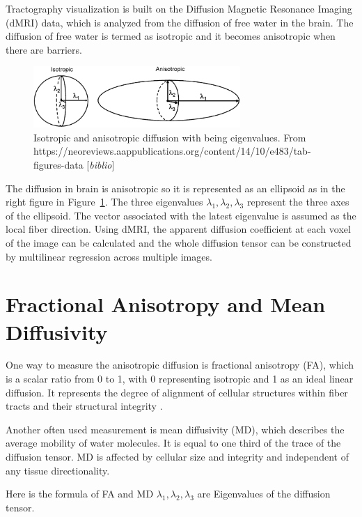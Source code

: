 \documentclass[hyperref, plainreport, noproblem]{cgvpub1}
\newcommand{\comment}[1]{{\color{red}[\textit{#1}]}}
\begin{document}
Tractography visualization is built on the Diffusion Magnetic Resonance Imaging (dMRI) data, which is analyzed from the diffusion of free water in the brain. The diffusion of free water is termed as isotropic and it becomes anisotropic when there are barriers. 

\begin{figure}[h]
	\centering
	\includegraphics[width=0.7\textwidth]{iso_ani_diff}
	\caption{Isotropic and anisotropic diffusion with  being eigenvalues. From
https://neoreviews.aappublications.org/content/14/10/e483/tab-figures-data \comment{biblio}}
	\label{fig:iso_ani_diff}
\end{figure}

The diffusion in brain is anisotropic so it is represented as an ellipsoid as in the right figure in Figure~\ref{fig:iso_ani_diff}. The three eigenvalues  $\lambda_1, \lambda_2, \lambda_3$ represent the three axes of the ellipsoid. The vector associated with the latest eigenvalue is assumed as the local fiber direction.\cite{tak}
Using dMRI, the apparent diffusion coefficient at each voxel of the image can be calculated and the whole diffusion tensor can be constructed by multilinear regression across multiple images.

\section{Fractional Anisotropy and Mean Diffusivity }
One way to measure the anisotropic diffusion is fractional anisotropy (FA), which is a scalar ratio from 0 to 1, with 0 representing isotropic and 1 as an ideal linear diffusion. It represents the degree of alignment of cellular structures within fiber tracts and their structural integrity \cite{cer}.

Another often used measurement is mean diffusivity (MD), which describes the average mobility of water molecules. It is equal to one third of the trace of the diffusion tensor. MD is affected by cellular size and integrity and independent of any tissue directionality. \cite{cer}

Here is the formula of FA and MD $\lambda_1, \lambda_2, \lambda_3$  are Eigenvalues of the diffusion tensor.
\end{document}
